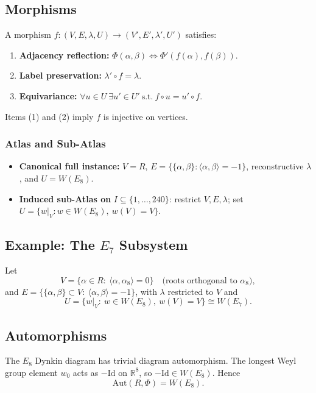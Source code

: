 \documentclass[12pt]{article}
\begin{document}
\subsection*{Morphisms}
A morphism $f:(V,E,\lambda,U)\to(V',E',\lambda',U')$ satisfies:
\begin{enumerate}[itemsep=2pt,topsep=4pt,leftmargin=16pt]
\item \textbf{Adjacency reflection: } $\Phi(\alpha,\beta)\iff \Phi'(f(\alpha),f(\beta))$.
\item \textbf{Label preservation: } $\lambda'\circ f=\lambda$.
\item \textbf{Equivariance: } $\forall u\in U\ \exists u'\in U'\ \text{s.t.}\ f\circ u=u'\circ f$.
\end{enumerate}
Items (1) and (2) imply $f$ is injective on vertices.

\subsubsection*{Atlas and Sub-Atlas}
\begin{itemize}[itemsep=2pt,topsep=2pt,leftmargin=16pt]
\item \textbf{Canonical full instance: } $V=R$, $E=\{\{\alpha,\beta\}:\langle\alpha,\beta\rangle=-1\}$, reconstructive $\lambda$, and $U=W(E_8)$.
\item \textbf{Induced sub-Atlas on } $I\subseteq\{1,\dots,240\}$: restrict $V,E,\lambda$; set $U=\{w|_V:w\in W(E_8),\ w(V)=V\}$.
\end{itemize}

\subsection{Example: The $E_7$ Subsystem}
Let
\[
V=\{\alpha\in R:\ \langle \alpha,\alpha_8\rangle=0\}\quad\text{(roots orthogonal to $\alpha_8$)},
\]
and $E=\{\{\alpha,\beta\}\subset V:\ \langle\alpha,\beta\rangle=-1\}$, with $\lambda$ restricted to $V$ and
\[
U=\{w|_V:\ w\in W(E_8),\ w(V)=V\}\cong W(E_7).
\]

\subsection{Automorphisms}
The $E_8$ Dynkin diagram has trivial diagram automorphism. The longest Weyl group element $w_0$ acts as $-\mathrm{Id}$ on $\mathbb{R}^8$, so $-\mathrm{Id}\in W(E_8)$. Hence
\[
\mathrm{Aut}(R,\Phi)=W(E_8).
\]
\end{document}
